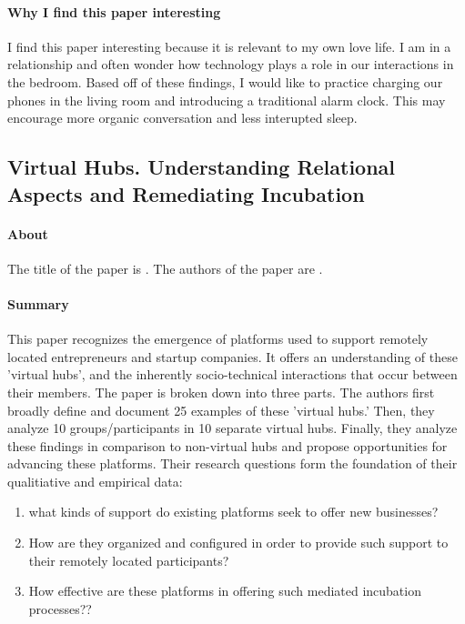 \paragraph{Why I find this paper interesting}
I find this paper interesting because it is relevant to my own love life. I am in a relationship and often wonder how technology plays a role in our interactions in the bedroom. Based off of these findings, I would like to practice charging our phones in the living room and introducing a traditional alarm clock. This may encourage more organic conversation and less interupted sleep.

\subsection{Virtual Hubs. Understanding Relational Aspects and Remediating Incubation}

\paragraph{About}
The title of the paper is . The authors of the paper are .

\paragraph{Summary}
This paper recognizes the emergence of platforms used to support remotely located entrepreneurs and startup companies. It offers an understanding of these 'virtual hubs', and the inherently socio-technical interactions that occur between their members. The paper is broken down into three parts. The authors first broadly define and document 25 examples of these 'virtual hubs.' Then, they analyze 10 groups/participants in 10 separate virtual hubs. Finally, they analyze these findings in comparison to non-virtual hubs and propose opportunities for advancing these platforms. Their research questions form the foundation of their qualitiative and empirical data:

\begin{enumerate}
\item
  what kinds of support do existing platforms seek to offer new businesses?
\item
  How are they organized and configured in order to provide such support to their remotely located participants?
\item
  How effective are these platforms in offering such mediated incubation processes??
\end{enumerate}

